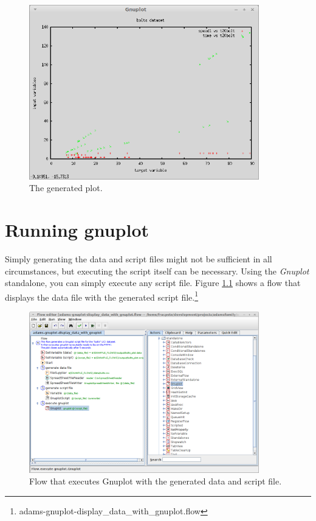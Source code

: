 \documentclass[a4paper]{book}
\begin{document}
\begin{figure}[htb]
  \centering
  \includegraphics[width=10.0cm]{images/write_data_and_script-output.png}
  \caption{The generated plot.}
  \label{write_data_and_script-output}
\end{figure}


\chapter{Running gnuplot}
Simply generating the data and script files might not be sufficient in all
circumstances, but executing the script itself can be necessary. Using the 
\textit{Gnuplot} standalone, you can simply execute any script file.
Figure \ref{execute_gnuplot} shows a flow that displays the data file with the
generated script file.\footnote{adams-gnuplot-display\_data\_with\_gnuplot.flow}

\begin{figure}[htb]
  \centering
  \includegraphics[width=10.0cm]{images/execute_gnuplot.png}
  \caption{Flow that executes Gnuplot with the generated data and script file.}
  \label{execute_gnuplot}
\end{figure}
\end{document}
